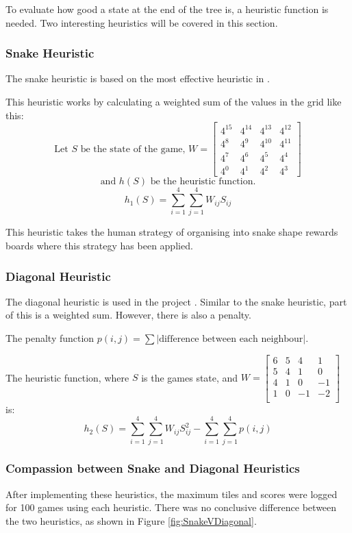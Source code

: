 \documentclass{article}
\begin{document}
To evaluate how good a state at the end of the tree is, a heuristic function is needed. Two interesting heuristics will be covered in this section. 

\subsubsection{Snake Heuristic}
\label{subsec:snake}
The snake heuristic is based on the most effective heuristic in \cite{aiplays2048}.

This heuristic works by calculating a weighted sum of the values in the grid like this:
\[
    \text{Let }S\text{ be the state of the game, }W=\begin{bmatrix}
    4^{15}&4^{14}&4^{13}&4^{12}\\
    4^8&4^9&4^{10}&4^{11}\\
    4^7&4^6&4^5&4^4\\
    4^0&4^1&4^2&4^3
    \end{bmatrix} \]\[\text{and }h(S)\text{ be the heuristic function.}
\]\[
    h_1(S)=\sum_{i=1}^{4}\sum_{j=1}^{4}W_{i j}S_{i j}
\]

This heuristic takes the human strategy of organising into snake shape rewards boards where this strategy has been applied.
\subsubsection{Diagonal Heuristic}
The diagonal heuristic is used in the project \cite{expectimax2048}.
Similar to the snake heuristic, part of this is a weighted sum. However, there is also a penalty.

The penalty function $p(i, j) = \sum |\text{difference between each neighbour}|$. 

The heuristic function, where $S$ is the games state, and
$
W=\begin{bmatrix}
    6&5&4&1\\
    5&4&1&0\\
    4&1&0&-1\\
    1&0&-1& -2\\
\end{bmatrix}
$ is:
\[
    h_2(S)=\sum_{i=1}^{4}\sum_{j=1}^{4}W_{ij}S_{ij}^2 - \sum_{i=1}^{4}\sum_{j=1}^{4}p(i,j)
\]

\subsubsection{Compassion between Snake and Diagonal Heuristics}
After implementing these heuristics, the maximum tiles and scores were logged for 100 games using each heuristic. There was no conclusive difference between the two heuristics, as shown in Figure \ref{fig:SnakeVDiagonal}. 
\end{document}
